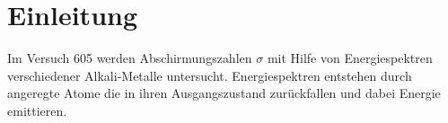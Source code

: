 \section{Einleitung}
\label{sec:Einleitung}
Im Versuch 605 werden Abschirmungszahlen $\sigma$ mit Hilfe von Energiespektren verschiedener Alkali-Metalle untersucht.
Energiespektren entstehen durch angeregte Atome die in ihren Ausgangszustand zurückfallen und dabei Energie emittieren.
